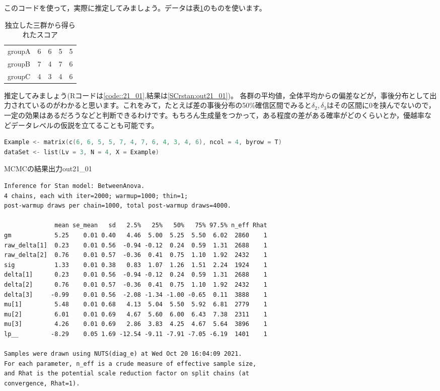 \documentclass{ltjsbook}
\begin{document}
このコードを使って，実際に推定してみましょう。データは表\ref{tbl::21_01}のものを使います。
\begin{table}[ht]
  \begin{center}
  \caption{独立した三群から得られたスコア}
  \begin{tabular}{l|llll}\hline
  groupA & 6 & 6 & 5 & 5\\
  groupB & 7 & 4 & 7 & 6\\
  groupC & 4 & 3 & 4 & 6\\\hline
  \end{tabular}
  \label{tbl::21_01}
  \end{center}
\end{table}

推定してみましょう(Rコードは\ref{code::21_01},結果は\ref{SCrstan:out21_01})。
各群の平均値，全体平均からの偏差などが，事後分布として出力されているのがわかると思います。これをみて，たとえば差の事後分布の50\%確信区間でみると$\delta_2,\delta_3$はその区間に0を挟んでないので，一定の効果はあるだろうなどと判断できるわけです。もちろん生成量をつかって，ある程度の差がある確率がどのくらいとか，優越率などデータレベルの仮説を立てることも可能です。

\begin{lstlisting}[language=c++,label={code::21_01},caption={三群の平均値の比較}]
Example <- matrix(c(6, 6, 5, 5, 7, 4, 7, 6, 4, 3, 4, 6), ncol = 4, byrow = T)
dataSet <- list(Lv = 3, N = 4, X = Example)
\end{lstlisting}
  
\begin{SCrstan}{MCMCの結果出力}{out21_01}
\begin{verbatim}
Inference for Stan model: BetweenAnova.
4 chains, each with iter=2000; warmup=1000; thin=1; 
post-warmup draws per chain=1000, total post-warmup draws=4000.

              mean se_mean   sd   2.5%   25%   50%   75% 97.5% n_eff Rhat
gm            5.25    0.01 0.40   4.46  5.00  5.25  5.50  6.02  2860    1
raw_delta[1]  0.23    0.01 0.56  -0.94 -0.12  0.24  0.59  1.31  2688    1
raw_delta[2]  0.76    0.01 0.57  -0.36  0.41  0.75  1.10  1.92  2432    1
sig           1.33    0.01 0.38   0.83  1.07  1.26  1.51  2.24  1924    1
delta[1]      0.23    0.01 0.56  -0.94 -0.12  0.24  0.59  1.31  2688    1
delta[2]      0.76    0.01 0.57  -0.36  0.41  0.75  1.10  1.92  2432    1
delta[3]     -0.99    0.01 0.56  -2.08 -1.34 -1.00 -0.65  0.11  3888    1
mu[1]         5.48    0.01 0.68   4.13  5.04  5.50  5.92  6.81  2779    1
mu[2]         6.01    0.01 0.69   4.67  5.60  6.00  6.43  7.38  2311    1
mu[3]         4.26    0.01 0.69   2.86  3.83  4.25  4.67  5.64  3896    1
lp__         -8.29    0.05 1.69 -12.54 -9.11 -7.91 -7.05 -6.19  1401    1

Samples were drawn using NUTS(diag_e) at Wed Oct 20 16:04:09 2021.
For each parameter, n_eff is a crude measure of effective sample size,
and Rhat is the potential scale reduction factor on split chains (at 
convergence, Rhat=1).
\end{verbatim}
\end{SCrstan}
\end{document}
